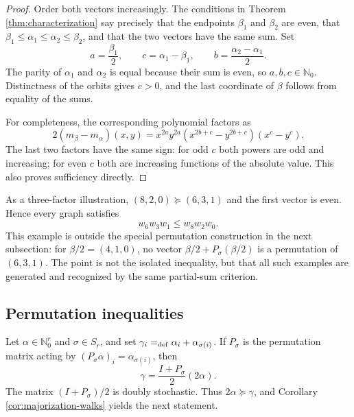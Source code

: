 \documentclass[11pt]{article}
\newcommand{\Nat}{\mathbb{N}}
\theoremstyle{remark}
\begin{document}
\begin{proof}
Order both vectors increasingly.  The conditions in
Theorem \ref{thm:characterization} say precisely that the endpoints $\beta_1$ and $\beta_2$ are even, that
$\beta_1\leq\alpha_1\leq\alpha_2\leq\beta_2$, and that the two vectors have the same sum.  Set
\[
  a=\frac{\beta_1}{2},\qquad
  c=\alpha_1-\beta_1,\qquad
  b=\frac{\alpha_2-\alpha_1}{2}.
\]
The parity of $\alpha_1$ and $\alpha_2$ is equal because their sum is even, so $a,b,c\in\Nat_0$.  Distinctness of the orbits gives $c>0$, and the last coordinate of $\beta$ follows from equality of the sums.

For completeness, the corresponding polynomial factors as
\begin{equation*}\label{eq:two-factor-factorization}
  2(m_\beta-m_\alpha)(x,y)
  =x^{2a}y^{2a}
    \left(x^{2b+c}-y^{2b+c}\right)(x^c-y^c).
\end{equation*}
The last two factors have the same sign: for odd $c$ both powers are odd and increasing; for even $c$ both are increasing functions of the absolute value.  This also proves sufficiency directly.
\end{proof}

As a three-factor illustration, $(8,2,0)\succeq(6,3,1)$ and the first vector is even.  Hence every graph satisfies
\begin{equation}\label{eq:three-factor-example}
  w_6w_3w_1\leq w_8w_2w_0.
\end{equation}
This example is outside the special permutation construction in the next
subsection: for $\beta/2=(4,1,0)$, no vector
$\beta/2+P_\sigma(\beta/2)$ is a permutation of $(6,3,1)$.  The point is not the isolated inequality, but that all such examples are generated and recognized by the same partial-sum criterion.


\subsection{Permutation inequalities}

Let $\alpha\in\Nat_0^r$ and $\sigma\in S_r$, and set
$\gamma_i=_{\rm def}\alpha_i+\alpha_{\sigma(i)}$.  If $P_\sigma$ is the permutation matrix acting by $(P_\sigma\alpha)_i=\alpha_{\sigma(i)}$, then
\[
  \gamma=\frac{I+P_\sigma}{2}(2\alpha).
\]
The matrix $(I+P_\sigma)/2$ is doubly stochastic.  Thus
$2\alpha\succeq\gamma$, and Corollary \ref{cor:majorization-walks} yields the next statement.
\end{document}
